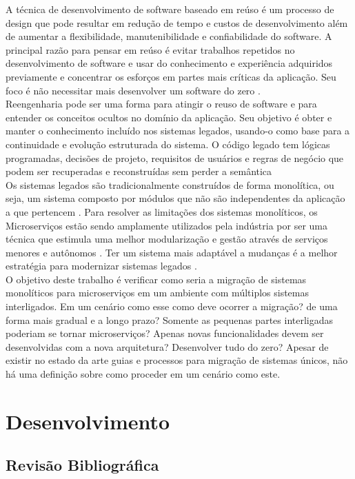 \documentclass[12pt]{article}
\begin{document}
A técnica de desenvolvimento de software baseado em reúso é um processo de design que pode resultar em redução de tempo e custos de desenvolvimento além de aumentar a flexibilidade, manutenibilidade e confiabilidade do software. A principal razão para pensar em reúso é evitar trabalhos repetidos no desenvolvimento de software e usar do conhecimento e experiência adquiridos previamente e concentrar os esforços em partes mais críticas da aplicação. Seu foco é não necessitar mais desenvolver um software do zero \cite{Yang}.  
\\
Reengenharia pode ser uma forma para atingir o reuso de software e para entender os conceitos ocultos no domínio da aplicação. Seu objetivo é obter e manter o conhecimento incluído nos sistemas legados, usando-o como base para a continuidade e evolução estruturada do sistema. O código legado tem lógicas programadas, decisões de projeto, requisitos de usuários e regras de negócio que podem ser recuperadas e reconstruídas sem perder a semântica \cite{Garcia2004a}
\\
Os sistemas legados são tradicionalmente construídos de forma monolítica, ou seja, um sistema composto por módulos que não são independentes da aplicação a que pertencem \cite{Dragoni2017}. Para resolver as limitações dos sistemas monolíticos, os Microserviços estão sendo amplamente utilizados pela indústria por ser uma técnica que estimula uma melhor modularização e gestão através de serviços menores e autônomos \cite{Carvalho2019}. Ter um sistema mais adaptável a mudanças é a melhor estratégia para modernizar sistemas legados \cite{Kamimura2019a}.
\\
O objetivo deste trabalho é verificar como seria a migração de sistemas monolíticos para microserviços em um ambiente com múltiplos sistemas interligados. Em um cenário como esse como deve ocorrer a migração? de uma forma mais gradual e a longo prazo? Somente as pequenas partes interligadas poderiam se tornar microserviços? Apenas novas funcionalidades devem ser desenvolvidas com a nova arquitetura? Desenvolver tudo do zero? Apesar de existir no estado da arte guias e processos para migração de sistemas únicos, não há uma definição sobre como proceder em um cenário como este. 

\section{Desenvolvimento} \label{sec:firstpage}

\subsection{Revisão Bibliográfica}
\end{document}
